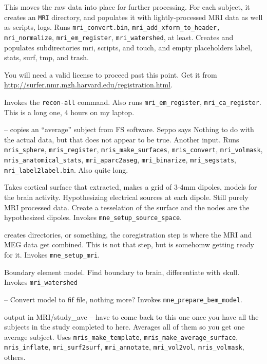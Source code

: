 \documentclass[11pt]{article}
\begin{document}
\begin{itemize}
This moves the raw data into place for further processing.  For each subject,
it creates an \verb+MRI+ directory, and populates it with lightly-processed
MRI data as well as scripts, logs.  Runs \verb+mri_convert.bin+,
\verb+mri_add_xform_to_header, +\verb+mri_normalize+,
\verb+mri_em_register+, \verb+mri_watershed+, at least.  Creates and populates
subdirectories mri, scripts, and touch, and empty placeholders label, stats,
surf, tmp, and trash.

You will need a valid \fs license
to proceed past this point.  Get it from
\url{http://surfer.nmr.mgh.harvard.edu/registration.html}.

 Invokes the \fs 
\verb+recon-all+ command.  Also runs \verb+mri_em_register+,
\verb+mri_ca_register+.  This is a long one, 4 hours on my laptop.

 -- copies an ``average'' subject from FS software. 
  Seppo says Nothing to do with the actual data, but that does not
  appear to be true.  Another input.  Runs
  \verb+mris_sphere+, \verb+mris_register+, \verb+mris_make_surfaces+,
  \verb+mris_convert+, \verb+mri_volmask+,
  \verb+mris_anatomical_stats+, \verb+mri_aparc2aseg+,
  \verb+mri_binarize+, \verb+mri_segstats+,
  \verb+mri_label2label.bin+.  Also quite long.

 Takes cortical surface that \fs
  extracted, makes a grid of 3-4mm dipoles, models for the brain
  activity. Hypothesizing electrical sources at each dipole.  Still
  purely MRI processed data.  Create a tesselation of the surface and
  the nodes are the hypothesized dipoles.  Invokes
  \verb+mne_setup_source_space+. 

 creates
directories, or something, the 
  coregistration step is where the MRI and MEG data get combined. This
  is not that step, but is somehomw getting ready for it.  Invokes
  \verb+mne_setup_mri+.

 Boundary element model.  Find boundary to brain,
  differentiate with skull.  Invokes \verb+mri_watershed+

 -- Convert
model to fif file, nothing more? 
  Invokes \verb+mne_prepare_bem_model+.

%
{output in MRI/study\_ave} -- have to come back to this one once you have
  all the subjects in the study completed to here.  Averages all of
  them so you get one average subject.  Uses \verb+mris_make_template+,
  \verb+mris_make_average_surface+, \verb+mris_inflate+,
  \verb+mri_surf2surf+, \verb+mri_annotate+, \verb+mri_vol2vol+,
  \verb+mris_volmask+, others. 

\end{itemize}
\end{document}

